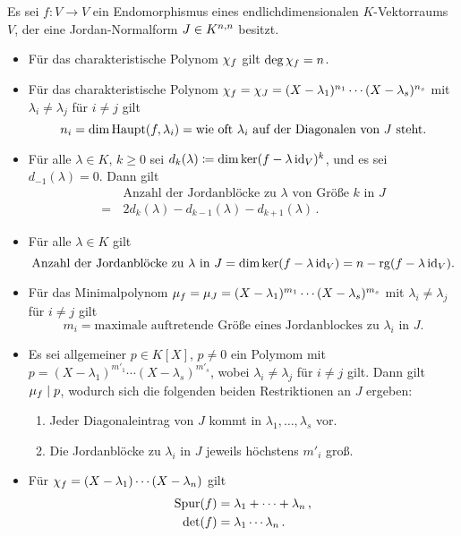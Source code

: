 \documentclass[a4paper,10pt,numbers = noenddot]{scrartcl}
\begin{document}
Es sei $f \colon V \to V$ ein Endomorphismus eines endlichdimensionalen $K$-Vektorraums $V$, der eine Jordan-Normalform $J \in \matrices{n}{K}$ besitzt.
\begin{itemize}
  \item
    Für das charakteristische Polynom $\charpol{f}$ gilt $\deg \charpol{f} = n$.
  \item
    Für das charakteristische Polynom $\charpol{f} = \charpol{J} = (X - \lambda_1)^{n_1} \dotsm (X - \lambda_s)^{n_s}$ mit $\lambda_i \neq \lambda_j$ für $i \neq j$ gilt
    \[
        n_i
      = \dim \hauptspace{f}{\lambda_i}
      = \text{wie oft $\lambda_i$ auf der Diagonalen von $J$ steht}.
    \]
  \item
    Für alle $\lambda \in K$, $k \geq 0$ sei $d_k(\lambda) \defined \dim \ker(f - \lambda \id_V)^k$, und es sei $d_{-1}(\lambda) = 0$.
    Dann gilt
    \begin{align*}
       &\,  \text{Anzahl der Jordanblöcke zu $\lambda$ von Größe $k$ in $J$} \\
      =&\,  2 d_k(\lambda) - d_{k-1}(\lambda) - d_{k+1}(\lambda) \,.
    \end{align*}
  \item
    Für alle $\lambda \in K$ gilt
    \[
        \text{Anzahl der Jordanblöcke zu $\lambda$ in $J$}
      = \dim \ker (f - \lambda \id_V)
      = n - \rank (f - \lambda \id_V).
    \]
  \item
    Für das Minimalpolynom $\minpol{f} = \minpol{J} = (X - \lambda_1)^{m_1} \dotsm (X - \lambda_s)^{m_s}$ mit $\lambda_i \neq \lambda_j$ für $i \neq j$ gilt
    \[
        m_i
      = \text{maximale auftretende Größe eines Jordanblockes zu $\lambda_i$ in $J$}.
    \]
  \item
    Es sei allgemeiner $p \in K[X]$, $p \neq 0$ ein Polymom mit $p = (X - \lambda_1)^{m'_1} \dotsm (X - \lambda_s)^{m'_s}$, wobei $\lambda_i \neq \lambda_j$ für $i \neq j$ gilt.
    Dann gilt $\minpol{f} \divides p$, wodurch sich die folgenden beiden Restriktionen an $J$ ergeben:
    \begin{enumerate}
      \item
        Jeder Diagonaleintrag von $J$ kommt in $\lambda_1, \dotsc, \lambda_s$ vor.
      \item
        Die Jordanblöcke zu $\lambda_i$ in $J$ jeweils höchstens $m'_i$ groß.
    \end{enumerate}
  \item
    Für $\charpol{f} = (X - \lambda_1) \dotsm (X - \lambda_n)$ gilt
    \begin{align*}
      \tr(f)  &=  \lambda_1 + \dotsb + \lambda_n \,,  \\
      \det(f) &=  \lambda_1 \dotsm \lambda_n \,.
    \end{align*}

\end{itemize}
\end{document}
